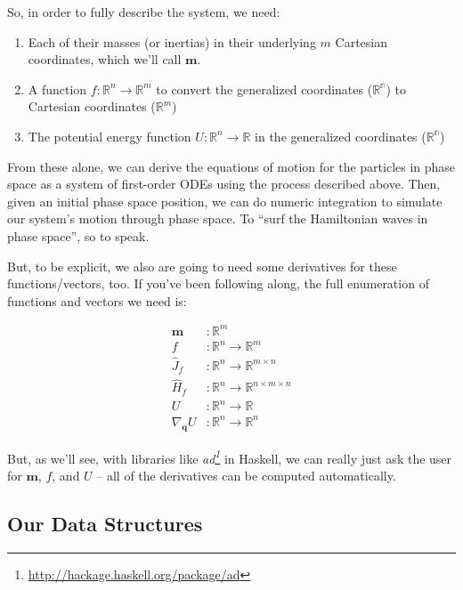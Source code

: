 \documentclass[]{article}
\renewcommand{\href}[2]{#2\footnote{\url{#1}}}
\begin{document}
So, in order to fully describe the system, we need:

\begin{enumerate}
\def\labelenumi{\arabic{enumi}.}
\tightlist
\item
  Each of their masses (or inertias) in their underlying \(m\) Cartesian
  coordinates, which we'll call \(\mathbf{m}\).
\item
  A function \(f : \mathbb{R}^n \rightarrow \mathbb{R}^m\) to convert the
  generalized coordinates (\(\mathbb{R^n}\)) to Cartesian coordinates
  (\(\mathbb{R}^m\))
\item
  The potential energy function \(U : \mathbb{R}^n \rightarrow \mathbb{R}\) in
  the generalized coordinates (\(\mathbb{R^n}\))
\end{enumerate}

From these alone, we can derive the equations of motion for the particles in
phase space as a system of first-order ODEs using the process described above.
Then, given an initial phase space position, we can do numeric integration to
simulate our system's motion through phase space. To ``surf the Hamiltonian
waves in phase space'', so to speak.

But, to be explicit, we also are going to need some derivatives for these
functions/vectors, too. If you've been following along, the full enumeration of
functions and vectors we need is:

\[
\begin{aligned}
\mathbf{m} & : \mathbb{R}^m \\
f & : \mathbb{R}^n \rightarrow \mathbb{R}^m \\
\hat{J}_f & : \mathbb{R}^n \rightarrow \mathbb{R}^{m \times n} \\
\hat{H}_f & : \mathbb{R}^n \rightarrow \mathbb{R}^{n \times m \times n} \\
U & : \mathbb{R}^n \rightarrow \mathbb{R} \\
\nabla_{\mathbf{q}} U & : \mathbb{R}^n \rightarrow \mathbb{R}^n
\end{aligned}
\]

But, as we'll see, with libraries like
\emph{\href{http://hackage.haskell.org/package/ad}{ad}} in Haskell, we can
really just ask the user for \(\mathbf{m}\), \(f\), and \(U\) -- all of the
derivatives can be computed automatically.

\hypertarget{our-data-structures}{%
\subsection{Our Data Structures}\label{our-data-structures}}
\end{document}
